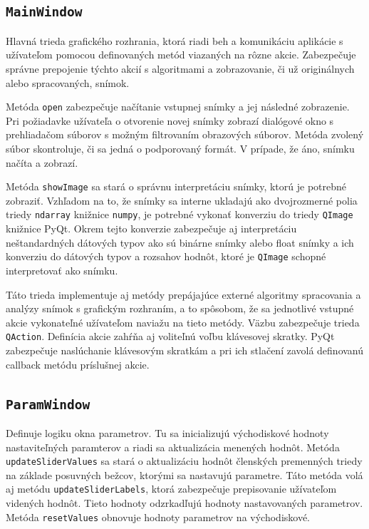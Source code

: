   \subsection{\texttt{MainWindow}}
  Hlavná trieda grafického rozhrania, ktorá riadi beh a komunikáciu aplikácie s užívateľom pomocou definovaných metód viazaných na rôzne akcie.
  Zabezpečuje správne prepojenie týchto akcií s algoritmami a zobrazovanie, či už originálnych alebo spracovaných, snímok.

  Metóda \texttt{open} zabezpečuje načítanie vstupnej snímky a jej následné zobrazenie. Pri požiadavke užívateľa o otvorenie novej snímky zobrazí
  dialógové okno s prehliadačom súborov s možným filtrovaním obrazových súborov. Metóda zvolený súbor skontroluje, či sa jedná o podporovaný formát.
  V prípade, že áno, snímku načíta a zobrazí.

  Metóda \texttt{showImage} sa stará o správnu interpretáciu snímky, ktorú je potrebné zobraziť. Vzhľadom na to, že snímky sa interne ukladajú ako
  dvojrozmerné polia triedy \texttt{ndarray} knižnice \texttt{numpy}, je potrebné vykonať konverziu do triedy \texttt{QImage} knižnice PyQt. Okrem tejto
  konverzie zabezpečuje aj interpretáciu neštandardných dátových typov ako sú binárne snímky alebo float snímky a ich konverziu do dátových typov a rozsahov
  hodnôt, ktoré je \texttt{QImage} schopné interpretovať ako snímku.

  Táto trieda implementuje aj metódy prepájajúce externé algoritmy spracovania a analýzy snímok s grafickým rozhraním, a to spôsobom, že sa jednotlivé
  vstupné akcie vykonateľné užívateľom naviažu na tieto metódy. Väzbu zabezpečuje trieda \texttt{QAction}. Definícia akcie zahŕňa aj voliteľnú  voľbu
  klávesovej skratky. PyQt zabezpečuje naslúchanie klávesovým skratkám a pri ich stlačení zavolá definovanú callback metódu príslušnej akcie.

  \subsection{\texttt{ParamWindow}}
  Definuje logiku okna parametrov. Tu sa inicializujú východiskové hodnoty nastaviteľných paramterov a riadi sa aktualizácia menených hodnôt.
  Metóda \texttt{updateSliderValues} sa stará o aktualizáciu hodnôt členských premenných triedy na základe posuvných bežcov, ktorými sa nastavujú parametre.
  Táto metóda volá aj metódu \texttt{updateSliderLabels}, ktorá zabezpečuje prepisovanie užívateľom videných hodnôt. Tieto hodnoty odzrkadľujú hodnoty
  nastavovaných parametrov. Metóda \texttt{resetValues} obnovuje hodnoty parametrov na východiskové.

